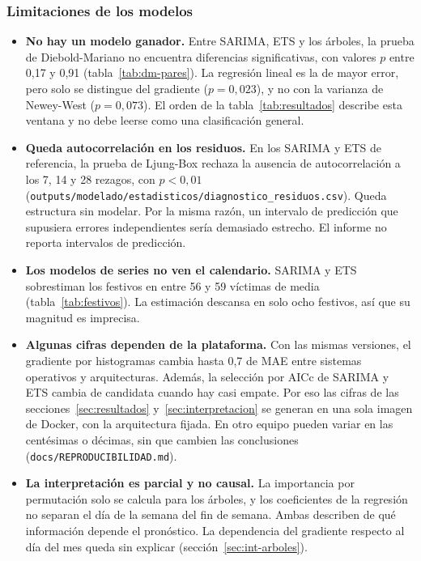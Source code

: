 \subsubsection{Limitaciones de los modelos}

\begin{itemize}
  \item \textbf{No hay un modelo ganador.} Entre SARIMA, ETS y los árboles, la prueba de Diebold-Mariano no encuentra diferencias significativas, con valores $p$ entre 0,17 y 0,91 (tabla~\ref{tab:dm-pares}). La regresión lineal es la de mayor error, pero solo se distingue del gradiente ($p = 0{,}023$), y no con la varianza de Newey-West ($p = 0{,}073$). El orden de la tabla~\ref{tab:resultados} describe esta ventana y no debe leerse como una clasificación general.
  \item \textbf{Queda autocorrelación en los residuos.} En los SARIMA y ETS de referencia, la prueba de Ljung-Box rechaza la ausencia de autocorrelación a los 7, 14 y 28 rezagos, con $p < 0{,}01$ (\texttt{outputs/\allowbreak{}modelado/\allowbreak{}estadisticos/\allowbreak{}diagnostico\_\allowbreak{}residuos.csv}). Queda estructura sin modelar. Por la misma razón, un intervalo de predicción que supusiera errores independientes sería demasiado estrecho. El informe no reporta intervalos de predicción.
  \item \textbf{Los modelos de series no ven el calendario.} SARIMA y ETS sobrestiman los festivos en entre 56 y 59 víctimas de media (tabla~\ref{tab:festivos}). La estimación descansa en solo ocho festivos, así que su magnitud es imprecisa.
  \item \textbf{Algunas cifras dependen de la plataforma.} Con las mismas versiones, el gradiente por histogramas cambia hasta 0,7 de MAE entre sistemas operativos y arquitecturas. Además, la selección por AICc de SARIMA y ETS cambia de candidata cuando hay casi empate. Por eso las cifras de las secciones~\ref{sec:resultados} y~\ref{sec:interpretacion} se generan en una sola imagen de Docker, con la arquitectura fijada. En otro equipo pueden variar en las centésimas o décimas, sin que cambien las conclusiones (\texttt{docs/\allowbreak{}REPRODUCIBILIDAD.md}).
  \item \textbf{La interpretación es parcial y no causal.} La importancia por permutación solo se calcula para los árboles, y los coeficientes de la regresión no separan el día de la semana del fin de semana. Ambas describen de qué información depende el pronóstico. La dependencia del gradiente respecto al día del mes queda sin explicar (sección~\ref{sec:int-arboles}).
\end{itemize}

